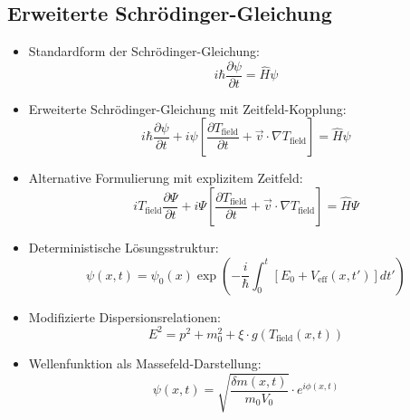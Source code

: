 \documentclass[12pt,a4paper]{article}
\begin{document}
	\subsection{Erweiterte Schrödinger-Gleichung}
	\begin{itemize}
		\item Standardform der Schrödinger-Gleichung:
		\begin{equation}
			i\hbar \frac{\partial \psi}{\partial t} = \hat{H}\psi
		\end{equation}
		
		\item Erweiterte Schrödinger-Gleichung mit Zeitfeld-Kopplung:
		\begin{equation}
			\boxed{i\hbar \frac{\partial\psi}{\partial t} + i\psi\left[\frac{\partial T_{\text{field}}}{\partial t} + \vec{v} \cdot \nabla T_{\text{field}}\right] = \hat{H}\psi}
		\end{equation}
		
		\item Alternative Formulierung mit explizitem Zeitfeld:
		\begin{equation}
			\boxed{i T_{\text{field}} \frac{\partial\Psi}{\partial t} + i\Psi\left[\frac{\partial T_{\text{field}}}{\partial t} + \vec{v} \cdot \nabla T_{\text{field}}\right] = \hat{H}\Psi}
		\end{equation}
		
		\item Deterministische Lösungsstruktur:
		\begin{equation}
			\psi(x,t) = \psi_0(x) \exp\left(-\frac{i}{\hbar} \int_0^t \left[E_0 + V_{\text{eff}}(x,t')\right] dt'\right)
		\end{equation}
		
		\item Modifizierte Dispersionsrelationen:
		\begin{equation}
			E^2 = p^2 + m_0^2 + \xi \cdot g(T_{\text{field}}(x,t))
		\end{equation}
		
		\item Wellenfunktion als Massefeld-Darstellung:
		\begin{equation}
			\psi(x,t) = \sqrt{\frac{\delta m(x,t)}{m_0 V_0}} \cdot e^{i\phi(x,t)}
		\end{equation}
	\end{itemize}
	
\end{document}
